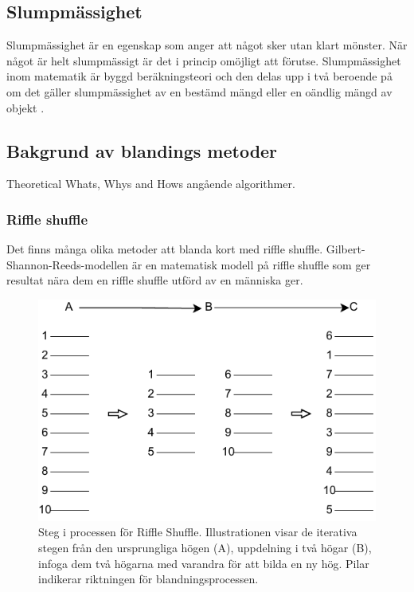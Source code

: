 \documentclass[swedish,a4paper]{article}
\begin{document}
\subsection{Slumpmässighet}

Slumpmässighet är en egenskap som anger att något sker utan klart mönster. När
något är helt slumpmässigt är det i princip omöjligt att förutse. Slumpmässighet
inom matematik är byggd beräknings\-teori och den delas upp i två beroende på om
det gäller slumpmässighet av en bestämd mängd eller en oändlig mängd av objekt
\parencite[49-66]{Terwijn2016}.

\subsection{Bakgrund av blandings metoder}
Theoretical Whats, Whys and Hows angående algorithmer.

\subsubsection{Riffle shuffle}
\label{sec:riffle_shuffle}
Det finns många olika metoder att blanda kort med riffle shuffle. Gilbert-Shannon-Reeds-modellen är en 
matematisk modell på riffle shuffle som ger resultat nära dem en riffle shuffle utförd av en människa ger.

\begin{figure}[H]
	\begin{center}
		\includegraphics{images/rifflle-shuffle.pdf}
	\end{center}
	\captionsetup{justification=centering,margin=2cm}
	\caption{Steg i processen för Riffle Shuffle. Illustrationen visar de
	iterativa stegen från den ursprungliga högen (A), uppdelning i två
	högar (B), infoga dem två högarna med varandra för att bilda en ny hög.
        Pilar indikerar riktningen för blandningsprocessen.}
	\label{fig:riffle_shuffle_1}
\end{figure}
\end{document}
